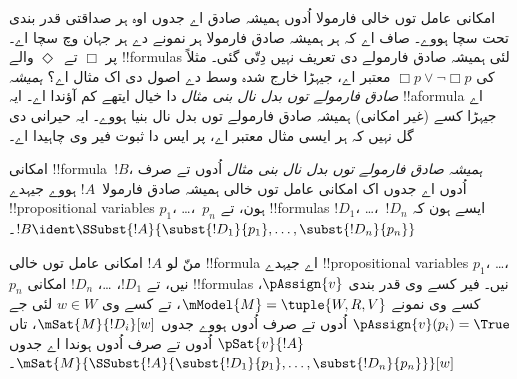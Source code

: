 \documentclass[../../../include/open-logic-section]{subfiles}
\begin{document}


\begin{explain}
امکانی عامل توں خالی فارمولا اُدوں ہمیشہ صادق اے جدوں اوہ ہر صداقتی قدر بندی تحت سچا ہووے۔ صاف اے کہ ہر ہمیشہ صادق فارمولا ہر نمونے دے ہر جہان وچ سچا اے۔ پر $\Box$ تے~$\Diamond$ والے !!{formula}s لئی ہمیشہ صادق فارمولے دی تعریف نہیں دِتّی گئی۔ مثلاً کی $\Box p \lor \lnot \Box p$ معتبر اے، جیہڑا خارج شدہ وسط دے اصول دی اک مثال اے؟ \emph{ہمیشہ صادق فارمولے توں بدل نال بنی مثال} دا خیال ایتھے کم آؤندا اے۔ ایہ !!a{formula} اے جیہڑا کسے (غیر امکانی) ہمیشہ صادق فارمولے توں بدل نال بنیا ہووے۔ ایہ حیرانی دی گل نہیں کہ ہر ایسی مثال معتبر اے، پر ایس دا ثبوت فیر وی چاہیدا اے۔
\end{explain}

\begin{defn}
  امکانی !!{formula}~$!B$، \emph{ہمیشہ صادق فارمولے توں بدل نال بنی مثال} اُدوں تے صرف اُدوں اے جدوں اک امکانی عامل توں خالی ہمیشہ صادق فارمولا~$!A$ ہووے جیہدے !!{propositional
    variable}s $p_1$، \dots،~$p_n$ ہون، تے !!{formula}s $!D_1$،
  \dots،~$!D_n$ ایسے ہون کہ $!B \ident \SSubst{!A}{\subst{!D_1}{p_1},
    \dots, \subst{!D_n}{p_n}}$۔
\end{defn}

\begin{lem}
  منّ لو $!A$ امکانی عامل توں خالی !!{formula} اے جیہدے !!{propositional
  variable}s $p_1$، \dots، $p_n$ نیں، تے $!D_1$، \dots،
  $!D_n$ امکانی !!{formula}s نیں۔ فیر کسے وی قدر بندی $\pAssign{v}$،
  کسے وی نمونے $\mModel{M} = \tuple{W, R, V}$، تے کسے وی $w \in W$ لئی جے
  $\pAssign{v}(p_i) = \True$ اُدوں تے صرف اُدوں ہووے جدوں $\mSat{M}{!D_i}[w]$، تاں
  $\pSat{v}{!A}$ اُدوں تے صرف اُدوں ہوندا اے جدوں
  $\mSat{M}{\SSubst{!A}{\subst{!D_1}{p_1}, \dots,
      \subst{!D_n}{p_n}}}[w]$۔
\end{lem}
\end{document}
